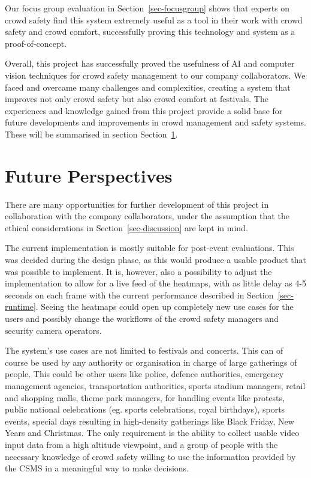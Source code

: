 \documentclass[
]{article}
\begin{document}
Our focus group evaluation in Section~\ref{sec-focusgroup} shows that
experts on crowd safety find this system extremely useful as a tool in
their work with crowd safety and crowd comfort, successfully proving
this technology and system as a proof-of-concept.

Overall, this project has successfully proved the usefulness of AI and
computer vision techniques for crowd safety management to our company
collaborators. We faced and overcame many challenges and complexities,
creating a system that improves not only crowd safety but also crowd
comfort at festivals. The experiences and knowledge gained from this
project provide a solid base for future developments and improvements in
crowd management and safety systems. These will be summarised in section
Section~\ref{sec-perspective}.

\newpage{}

\hypertarget{sec-perspective}{%
\section{Future Perspectives}\label{sec-perspective}}

There are many opportunities for further development of this project in
collaboration with the company collaborators, under the assumption that
the ethical considerations in Section~\ref{sec-discussion} are kept in
mind.

The current implementation is mostly suitable for post-event
evaluations. This was decided during the design phase, as this would
produce a usable product that was possible to implement. It is, however,
also a possibility to adjust the implementation to allow for a live feed
of the heatmaps, with as little delay as 4-5 seconds on each frame with
the current performance described in Section~\ref{sec-runtime}. Seeing
the heatmaps could open up completely new use cases for the users and
possibly change the workflows of the crowd safety managers and security
camera operators.

The system's use cases are not limited to festivals and concerts. This
can of course be used by any authority or organisation in charge of
large gatherings of people. This could be other users like police,
defence authorities, emergency management agencies, transportation
authorities, sports stadium managers, retail and shopping malls, theme
park managers, for handling events like protests, public national
celebrations (eg. sports celebrations, royal birthdays), sports events,
special days resulting in high-density gatherings like Black Friday, New
Years and Christmas. The only requirement is the ability to collect
usable video input data from a high altitude viewpoint, and a group of
people with the necessary knowledge of crowd safety willing to use the
information provided by the CSMS in a meaningful way to make decisions.
\end{document}
